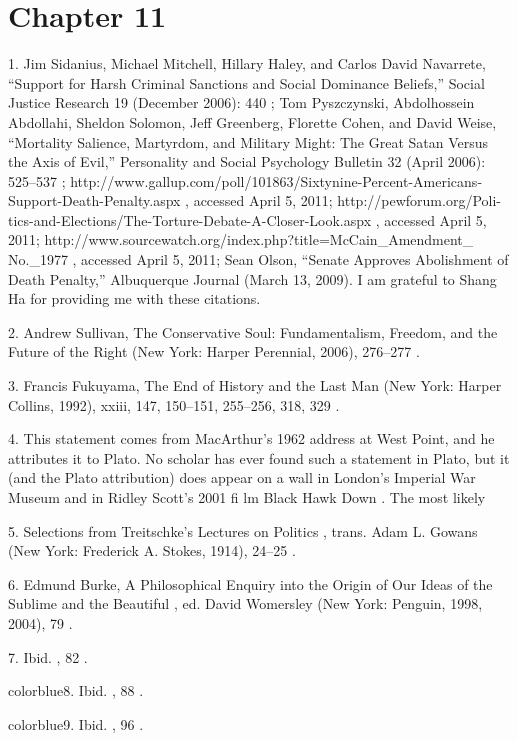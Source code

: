 \section{Chapter 11}


	{\color{blue}1}. Jim Sidanius, Michael Mitchell, Hillary Haley, and Carlos David Navarrete, “Support for Harsh Criminal Sanctions and Social Dominance Beliefs,” Social Justice Research 19 (December 2006): 440 ; Tom Pyszczynski, Abdolhossein Abdollahi, Sheldon Solomon, Jeff Greenberg, Florette Cohen, and David Weise, “Mortality Salience, Martyrdom, and Military Might: The Great Satan Versus the Axis of Evil,” Personality and Social Psychology Bulletin 32 (April 2006): 525–537 ; http://www.gallup.com/poll/101863/Sixtynine-Percent-Americans- Support-Death-Penalty.aspx , accessed April 5, 2011; http://pewforum.org/Poli- tics-and-Elections/The-Torture-Debate-A-Closer-Look.aspx , accessed April 5, 2011; http://www.sourcewatch.org/index.php?title=McCain_Amendment_ No._1977 , accessed April 5, 2011; Sean Olson, “Senate Approves Abolishment of Death Penalty,” Albuquerque Journal (March 13, 2009). I am grateful to Shang Ha for providing me with these citations.


	{\color{blue}2}. Andrew Sullivan, The Conservative Soul: Fundamentalism, Freedom, and the Future of the Right (New York: Harper Perennial, 2006), 276–277 .


	{\color{blue}3}. Francis Fukuyama, The End of History and the Last Man (New York: Harper Collins, 1992), xxiii, 147, 150–151, 255–256, 318, 329 .


	{\color{blue}4}. This statement comes from MacArthur’s 1962 address at West Point, and he attributes it to Plato. No scholar has ever found such a statement in Plato, but it (and the Plato attribution) does appear on a wall in London’s Imperial War Museum and in Ridley Scott’s 2001 fi lm Black Hawk Down . The most likely


	{\color{blue}5}. Selections from Treitschke’s Lectures on Politics , trans. Adam L. Gowans (New York: Frederick A. Stokes, 1914), 24–25 .


	{\color{blue}6}. Edmund Burke, A Philosophical Enquiry into the Origin of Our Ideas of the Sublime and the Beautiful , ed. David Womersley (New York: Penguin, 1998, 2004), 79 .


	{\color{blue}7}. Ibid. , 82 .


	{color{blue}8}. Ibid. , 88 .


	{color{blue}9}. Ibid. , 96 .


